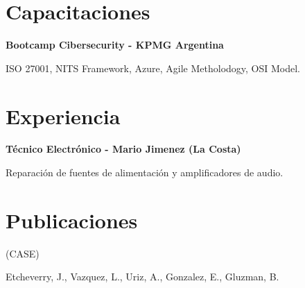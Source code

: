 \documentclass[a4paper,10pt]{article}
\begin{document}
\begin{adjustbox}{valign=t}
\begin{minipage}{0.60\textwidth}
\section*{Capacitaciones}
\begin{description}
\raggedright

\item[ \textcolor{ColorOne}{Nov.2021}] 
	\textbf{Bootcamp Cibersecurity - KPMG Argentina} \Myskip
    \item ISO 27001, NITS Framework, Azure, Agile Metholodogy, OSI Model.\MySkip
\end{description}


\section*{Experiencia}
\begin{description}
\raggedright

\item[ \textcolor{ColorOne}{2015-2019}] 
	\textbf{Técnico Electrónico - Mario Jimenez (La Costa)}\\ \Myskip
	\item	Reparación de fuentes de alimentación y amplificadores de audio. \MySkip	 	
\end{description}
\section*{Publicaciones}
\begin{description}
\raggedright

\item[ \textcolor{ColorOne}{Nov.2021}] 
	 (CASE) \Myskip
    \item Etcheverry, J., Vazquez, L., Uriz, A., Gonzalez, E., Gluzman, B.\MySkip
\end{description}

 
%
	


\end{minipage}
\end{adjustbox}
\end{document}

